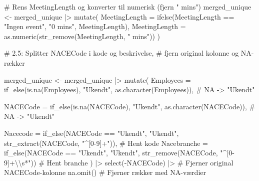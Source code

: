 \documentclass[
  11pt,
  letterpaper,
  DIV=11,
  numbers=noendperiod]{scrartcl}
\newenvironment{Shaded}{\begin{snugshade}}{\end{snugshade}}
\newcommand{\AttributeTok}[1]{\textcolor[rgb]{0.40,0.45,0.13}{#1}}
\newcommand{\CommentTok}[1]{\textcolor[rgb]{0.37,0.37,0.37}{#1}}
\newcommand{\FunctionTok}[1]{\textcolor[rgb]{0.28,0.35,0.67}{#1}}
\newcommand{\NormalTok}[1]{\textcolor[rgb]{0.00,0.23,0.31}{#1}}
\newcommand{\OtherTok}[1]{\textcolor[rgb]{0.00,0.23,0.31}{#1}}
\newcommand{\SpecialCharTok}[1]{\textcolor[rgb]{0.37,0.37,0.37}{#1}}
\newcommand{\StringTok}[1]{\textcolor[rgb]{0.13,0.47,0.30}{#1}}
\begin{document}
\begin{Shaded}
\begin{Highlighting}[]
\CommentTok{\# Rens MeetingLength og konverter til numerisk (fjern " mins")}
\NormalTok{merged\_unique }\OtherTok{\textless{}{-}}\NormalTok{ merged\_unique }\SpecialCharTok{|\textgreater{}} 
  \FunctionTok{mutate}\NormalTok{(}
    \AttributeTok{MeetingLength =} \FunctionTok{ifelse}\NormalTok{(MeetingLength }\SpecialCharTok{==} \StringTok{"Ingen event"}\NormalTok{, }\StringTok{"0 mins"}\NormalTok{, }
\NormalTok{                           MeetingLength), }
    \AttributeTok{MeetingLength =} \FunctionTok{as.numeric}\NormalTok{(}\FunctionTok{str\_remove}\NormalTok{(MeetingLength, }\StringTok{" mins"}\NormalTok{))}
\NormalTok{  )}

\CommentTok{\# 2.5: Splitter NACECode i kode og beskrivelse, }
\CommentTok{\# fjern original kolonne og NA{-}rækker}

\NormalTok{merged\_unique }\OtherTok{\textless{}{-}}\NormalTok{ merged\_unique }\SpecialCharTok{|\textgreater{}}
  \FunctionTok{mutate}\NormalTok{(}
    \AttributeTok{Employees   =} \FunctionTok{if\_else}\NormalTok{(}\FunctionTok{is.na}\NormalTok{(Employees), }\StringTok{"Ukendt"}\NormalTok{, }\FunctionTok{as.character}\NormalTok{(Employees)),}
    \CommentTok{\# NA {-}\textgreater{} "Ukendt"}
    
    \AttributeTok{NACECode    =} \FunctionTok{if\_else}\NormalTok{(}\FunctionTok{is.na}\NormalTok{(NACECode),  }\StringTok{"Ukendt"}\NormalTok{, }\FunctionTok{as.character}\NormalTok{(NACECode)),}
    \CommentTok{\# NA {-}\textgreater{} "Ukendt"}
    
    \AttributeTok{Nacecode    =} \FunctionTok{if\_else}\NormalTok{(NACECode }\SpecialCharTok{==} \StringTok{"Ukendt"}\NormalTok{, }\StringTok{"Ukendt"}\NormalTok{, }
                          \FunctionTok{str\_extract}\NormalTok{(NACECode, }\StringTok{"\^{}[0{-}9]+"}\NormalTok{)),                 }
    \CommentTok{\# Hent kode}
    \AttributeTok{Nacebranche =} \FunctionTok{if\_else}\NormalTok{(NACECode }\SpecialCharTok{==} \StringTok{"Ukendt"}\NormalTok{, }\StringTok{"Ukendt"}\NormalTok{, }
                          \FunctionTok{str\_remove}\NormalTok{(NACECode, }\StringTok{"\^{}[0{-}9]+}\SpecialCharTok{\textbackslash{}\textbackslash{}}\StringTok{s*"}\NormalTok{))               }
    \CommentTok{\# Hent branche}
\NormalTok{  ) }\SpecialCharTok{|\textgreater{}}
  \FunctionTok{select}\NormalTok{(}\SpecialCharTok{{-}}\NormalTok{NACECode) }\SpecialCharTok{|\textgreater{}}  \CommentTok{\# Fjerner original NACECode{-}kolonne}
  \FunctionTok{na.omit}\NormalTok{()             }\CommentTok{\# Fjerner rækker med NA{-}værdier}


\end{Highlighting}
\end{Shaded}
\end{document}
